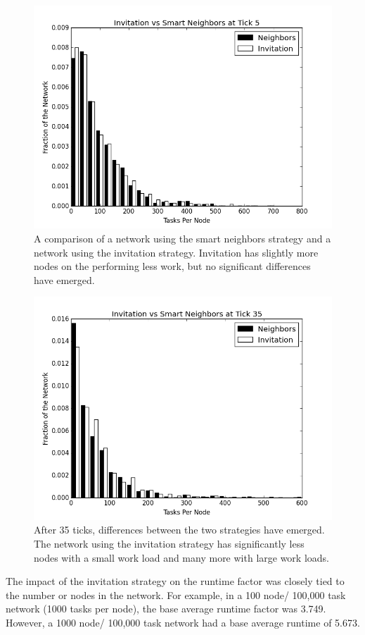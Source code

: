 \begin{figure}
	\centering
	\includegraphics[width=0.7\linewidth]{figs/inviteNeighborsHist5}
	\caption[Invitation  vs smart neighbor injection after 5 ticks.]{A comparison of a network using the smart neighbors strategy and a network using the invitation strategy.  Invitation has slightly more nodes on the performing less work, but no significant differences have emerged.}
	\label{fig:inviteNeighborsHist5}
\end{figure}


\begin{figure}
	\centering
	\includegraphics[width=0.7\linewidth]{figs/inviteNeighborsHist35}
	\caption[Invitation vs smart neighbor injection after 35 ticks.]{After 35 ticks, differences between the two strategies have emerged.  The network using the invitation strategy has significantly less nodes with a small work load and many more with large work loads.}
	\label{fig:inviteNeighborsHist35}
\end{figure}



The impact of the invitation strategy on the runtime factor was closely tied to the number or nodes in the network.
For example, in a 100 node/ 100,000 task network (1000 tasks per node), the base average runtime factor was 3.749.
However, a 1000 node/ 100,000 task  network had a base average runtime of 5.673.

